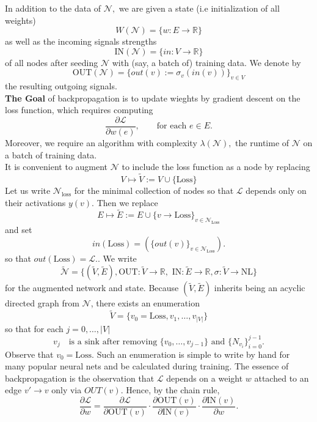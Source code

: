 \documentclass[12pt,reqno]{amsart}
\newcommand{\R}{{\mathbb R}}
\newcommand{\set}[1]{\{#1\}}
\newcommand{\twiddle}[1]{\ensuremath{\widetilde{#1}}}
\newcommand{\gives}{\ensuremath{\rightarrow}}
\newcommand{\abs}[1]{\left\lvert #1 \right\rvert}
\newcommand{\lr}[1]{\ensuremath{\left(#1\right)}}
\begin{document}
In addition to the data of $\mathcal N,$ we are given a state (i.e initialization of all weights) 
\[W\lr{\mathcal N}=\set{w: E\gives \R}\]
as well as the incoming signals strengths
\[\text{IN}(\mathcal N)=\set{in:V\gives \R}\]
of all nodes after seeding $\mathcal N$ with (say, a batch of) training data. We denote by 
\[\text{OUT}(\mathcal N)=\set{out(v):=\sigma_v(in(v))}_{v\in V}\]
the resulting outgoing signals.\\
\linebreak
{\bf The Goal} of backpropagation is to update wieghts by gradient descent on the loss function, which requires computing
\begin{equation}
\frac{\partial \mathcal L}{\partial w(e)},\qquad \text{for each }e\in E.\label{E:Goal}
\end{equation}
Moreover, we require an algorithm with complexity $\lambda(\mathcal N),$ the runtime of $\mathcal N$ on a batch of training data. \\
\linebreak
\noindent It is convenient to augment $\mathcal N$ to include the loss function as a node by replacing
\[V\mapsto \twiddle{V}:=V\cup \set{\text{Loss}}\] 
Let us write $\mathcal N_{\text{loss}}$ for the minimal collection of nodes so that $\mathcal L$ depends only on their activations $y(v)$. Then we replace
\[E\mapsto \twiddle{E}:=E\cup \set{v\gives\text{Loss}}_{v\in \mathcal N_\text{Loss}}\]
and set 
\[in(\text{Loss})=\lr{\set{out(v)}_{v\in \mathcal N_{\text{Loss}}}}.\]
so that $out(\text{Loss})=\mathcal L.$. We write 
\[\twiddle{\mathcal N}=\set{(\twiddle{V},  \twiddle{E}), \text{OUT}:\twiddle{V}\gives \R,\,\, \text{IN}: \twiddle{E}\gives  \R, \sigma: \twiddle{V}\gives \text{NL}}\]
for the augmented network and state. Because $(\twiddle{V},\twiddle{E})$ inherits being an acyclic directed graph from $\mathcal N$, there exists an enumeration 
\[\twiddle{V}=\set{v_0=\text{Loss},v_1,\ldots, v_{\abs{V}}}\]
so that for each $j=0,\ldots, \abs{V}$ 
\[v_j\quad \text{is a sink after removing } \set{v_0,\ldots, v_{j-1}}\text{  and  } \set{N_{v_i}}_{i=0}^{j-1}.\]
Observe that $v_0=\text{Loss}.$ Such an enumeration is simple to write by hand for many popular neural nets and be calculated during training. The essence of backpropagation is the observation that $\mathcal L$ depends on a weight $w$ attached to an edge $v'\gives v$ only via $OUT(v).$ Hence, by the chain rule, 
\[\frac{\partial \mathcal L }{\partial  w}=\frac{\partial \mathcal L }{\partial  \text{OUT}(v)}\cdot\frac{\partial \text{OUT}(v)}{\partial \text{IN}(v)}\cdot \frac{\partial \text{IN}(v)}{\partial w}.\]
\end{document}
